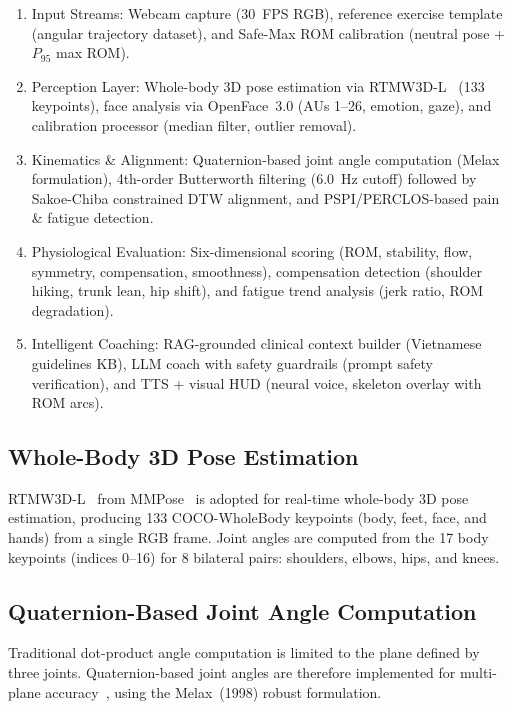 \begin{enumerate}[itemsep=2pt, topsep=3pt, parsep=0pt]
    \item Input Streams: Webcam capture (30~FPS RGB), reference exercise template (angular trajectory dataset), and Safe-Max ROM calibration (neutral pose + $P_{95}$ max ROM).
    \item Perception Layer: Whole-body 3D pose estimation via RTMW3D-L~\cite{jiang2024rtmw} (133 keypoints), face analysis via OpenFace~3.0 (AUs 1--26, emotion, gaze), and calibration processor (median filter, outlier removal).
    \item Kinematics \& Alignment: Quaternion-based joint angle computation (Melax formulation), 4th-order Butterworth filtering (6.0~Hz cutoff) followed by Sakoe-Chiba constrained DTW alignment, and PSPI/PERCLOS-based pain \& fatigue detection.
    \item Physiological Evaluation: Six-dimensional scoring (ROM, stability, flow, symmetry, compensation, smoothness), compensation detection (shoulder hiking, trunk lean, hip shift), and fatigue trend analysis (jerk ratio, ROM degradation).
    \item Intelligent Coaching: RAG-grounded clinical context builder (Vietnamese guidelines KB), LLM coach with safety guardrails (prompt safety verification), and TTS + visual HUD (neural voice, skeleton overlay with ROM arcs).
\end{enumerate}

\subsection{Whole-Body 3D Pose Estimation}
\label{subsec:pose3d}

RTMW3D-L~\cite{jiang2024rtmw} from MMPose~\cite{contributors2020openmmlab} is adopted for real-time whole-body 3D pose estimation, producing 133 COCO-WholeBody keypoints (body, feet, face, and hands) from a single RGB frame. Joint angles are computed from the 17 body keypoints (indices 0--16) for 8 bilateral pairs: shoulders, elbows, hips, and knees.

\subsection{Quaternion-Based Joint Angle Computation}
\label{subsec:quaternion}

Traditional dot-product angle computation is limited to the plane defined by three joints. Quaternion-based joint angles are therefore implemented for multi-plane accuracy~\cite{Pirek2017}, using the Melax~(1998) robust formulation.

